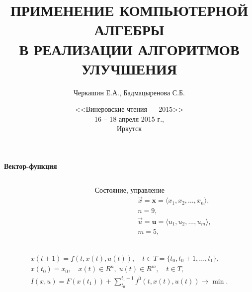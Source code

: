 \documentclass[10pt]{beamer}
\begin{document}
\title{ПРИМЕНЕНИЕ КОМПЬЮТЕРНОЙ АЛГЕБРЫ\\
В РЕАЛИЗАЦИИ АЛГОРИТМОВ УЛУЧШЕНИЯ}
\author{Черкашин Е.А., Бадмацыренова С.Б.}
\date[2015]{<<Винеровские чтения --- 2015>>
\\[0.3cm]
16 -- 18 апреля 2015 г.,\\
Иркутск
}
\maketitle

\begin{frame}{\textbf{Вектор-функция} }

  \begin{columns}[t]
    \begin{column}{0.75\textwidth}
      \def\xyz{$x_1,x_2,x_3$} \def\yaw{$x_6$} \def\pitch{$x_5$}
      \def\roll{$x_4$} \def\lift{$x_9$} \def\down{$\quad\! x_7$}
      \def\thrust{$u_1$} \def\rudder{$u_5$} \def\drag{$x_8$}
      \def\flaps{$u_2$} \def\aeleron{$u_3$} \def\engine{}
      \def\elevator{$u_4$} \def\svgwidth{\columnwidth}
      
    \end{column}
    \begin{column}{0.35\textwidth}
      \begin{block}{Состояние, управление}%
        \begin{gather*}
          \vec{x}=\mathbf{x}=\langle x_1,x_2,\ldots,x_n\rangle,\\
          n=9,\\
          \vec{u}=\mathbf{u}=\langle u_1,u_2,\ldots,u_m\rangle,\\
          m=5,\\
        \end{gather*}
      \end{block}
    \end{column}
  \end{columns}
\begin{block}{}
  \begin{gather}
x(t+1)=f(t,x(t),u(t)),\quad t \in T=\{t_0,t_0+1,...,t_1\},
	\label{eq100} \\
x(t_0)=x_0,\quad x(t)\in R^n,\; u(t) \in R^m,\quad t\in T,\label{eq100a} \\
I(x,u)=F(x(t_1))+ \sum_{t_0}^{t_1-1}f^0(t,x(t),u(t)) \to \min.
  \label{eq103}
  \end{gather}
\end{block}
\end{frame}
\end{document}
